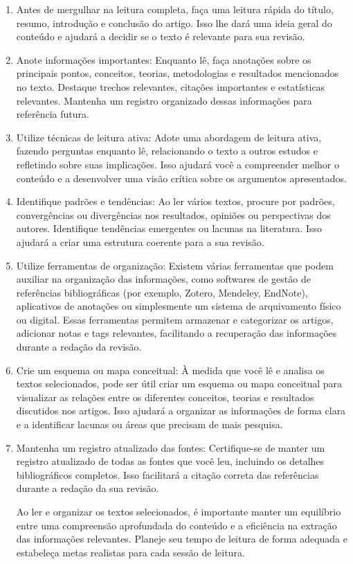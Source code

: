 \documentclass[12pt,a4paper, brazil]{article}
\begin{document}
\begin{enumerate}
    
\item Antes de mergulhar na leitura completa, faça uma leitura rápida do título, resumo, introdução e conclusão do artigo. Isso lhe dará uma ideia geral do conteúdo e ajudará a decidir se o texto é relevante para sua revisão.

\item Anote informações importantes: Enquanto lê, faça anotações sobre os principais pontos, conceitos, teorias, metodologias e resultados mencionados no texto. Destaque trechos relevantes, citações importantes e estatísticas relevantes. Mantenha um registro organizado dessas informações para referência futura.

\item Utilize técnicas de leitura ativa: Adote uma abordagem de leitura ativa, fazendo perguntas enquanto lê, relacionando o texto a outros estudos e refletindo sobre suas implicações. Isso ajudará você a compreender melhor o conteúdo e a desenvolver uma visão crítica sobre os argumentos apresentados.

\item Identifique padrões e tendências: Ao ler vários textos, procure por padrões, convergências ou divergências nos resultados, opiniões ou perspectivas dos autores. Identifique tendências emergentes ou lacunas na literatura. Isso ajudará a criar uma estrutura coerente para a sua revisão.

\item Utilize ferramentas de organização: Existem várias ferramentas que podem auxiliar na organização das informações, como softwares de gestão de referências bibliográficas (por exemplo, Zotero, Mendeley, EndNote), aplicativos de anotações ou simplesmente um sistema de arquivamento físico ou digital. Essas ferramentas permitem armazenar e categorizar os artigos, adicionar notas e tags relevantes, facilitando a recuperação das informações durante a redação da revisão.

\item Crie um esquema ou mapa conceitual: À medida que você lê e analisa os textos selecionados, pode ser útil criar um esquema ou mapa conceitual para visualizar as relações entre os diferentes conceitos, teorias e resultados discutidos nos artigos. Isso ajudará a organizar as informações de forma clara e a identificar lacunas ou áreas que precisam de mais pesquisa.

\item Mantenha um registro atualizado das fontes: Certifique-se de manter um registro atualizado de todas as fontes que você leu, incluindo os detalhes bibliográficos completos. Isso facilitará a citação correta das referências durante a redação da sua revisão.

Ao ler e organizar os textos selecionados, é importante manter um equilíbrio entre uma compreensão aprofundada do conteúdo e a eficiência na extração das informações relevantes. Planeje seu tempo de leitura de forma adequada e estabeleça metas realistas para cada sessão de leitura.

\end{enumerate}
\end{document}
